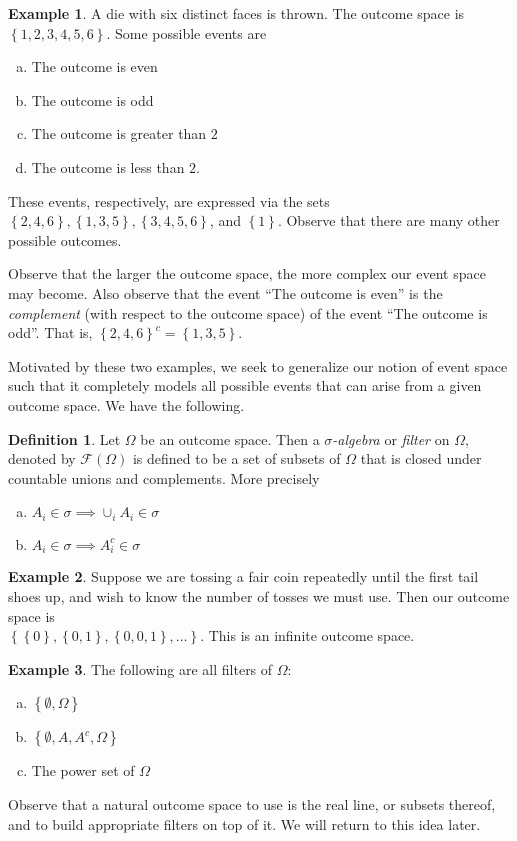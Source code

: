 \documentclass[12pt]{article}
\newcommand{\filter}{\mathcal{F}}
\theoremstyle{plain}
\theoremstyle{definition}
\newtheorem*{definition}{Definition}
\newtheorem*{example}{Example}
\theoremstyle{remark}
\numberwithin{equation}{section}  %
\begin{document}
\begin{example}
    A die with six distinct faces is thrown. The outcome space is
    $ \left\{ 1, 2, 3, 4, 5, 6 \right\} $. Some possible events are
    \begin{enumerate}[(a)]
        \item The outcome is even
        \item The outcome is odd
        \item The outcome is greater than $2$
        \item The outcome is less than $2$.
    \end{enumerate}
    These events, respectively, are expressed via the sets
    $ \left\{ 2, 4, 6 \right\} , \left\{ 1,3,5 \right\} , \left\{ 3, 4, 5, 6
    \right\}$, and $\left\{ 1 \right\}$.
    Observe that there are many other possible outcomes.
\end{example}
Observe that the larger the outcome space, the more complex
our event space may become. Also observe that the event
``The outcome is even'' is the \emph{complement} (with respect to the
outcome space) of
the event ``The outcome is odd''. That is,
${\left\{ 2,4,6 \right\}}^c
= \left\{ 1,3,5 \right\}$.

Motivated by these two examples, we seek to generalize our notion of
event space such that it completely models all possible events
that can arise from a given outcome space. We have the following.
\begin{definition}
    Let $\Omega$ be an outcome space. Then a \emph{$\sigma$-algebra}
    or \emph{filter} on $\Omega$, denoted by $\filter(\Omega)$ is defined to be a
    set of subsets of $\Omega$ that is closed under countable
    unions and complements.
    More precisely
    \begin{enumerate}[(a)]
        \item $ A_i \in  \sigma \implies \cup_i A_i \in \sigma$
        \item $A_i \in \sigma \implies A_i^c \in \sigma$
    \end{enumerate}
\end{definition}
\begin{example}
    Suppose we are tossing a fair coin repeatedly until the first tail shoes up,
    and wish to know the number of tosses we must use. Then our outcome space
    is \\ $ \left\{ \left\{ 0 \right\} , \left\{ 0,1 \right\} , \left\{ 0,0,1
    \right\},\ldots \right\}$. This is an infinite outcome space.
\end{example}
\begin{example} The following are all filters of $\Omega$:
    \begin{enumerate}[(a)]
        \item $\left\{ \emptyset, \Omega \right\}$
        \item $\left\{ \emptyset, A, A^c, \Omega \right\}$
        \item The power set of $\Omega$
    \end{enumerate}
\end{example}
Observe that a natural outcome space to use is the real line, or subsets
thereof, and to build appropriate filters on top of it. We will return
to this idea later.
\end{document}
